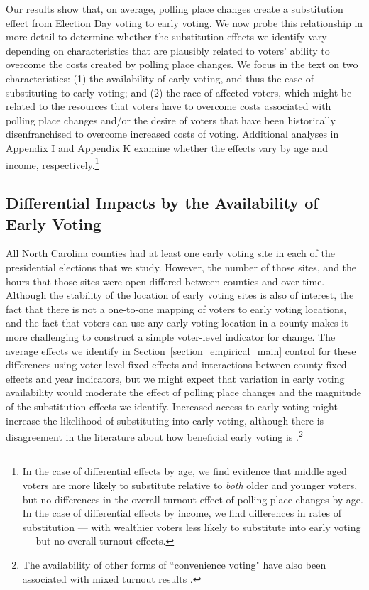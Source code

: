 \documentclass{cup_PSRM}
\begin{document}
\noindent Our results show that, on average, polling place changes create a substitution effect from Election Day voting to early voting.  We now probe this relationship in more detail to determine whether the substitution effects we identify vary depending on characteristics that are plausibly related to voters' ability to overcome the costs created by polling place changes. We focus in the text on two characteristics: (1) the availability of early voting, and thus the ease of substituting to early voting; and (2) the race of affected voters, which might be related to the resources that voters have to overcome costs associated with polling place changes and/or the desire of voters that have been historically disenfranchised to overcome increased costs of voting. Additional analyses in Appendix I and Appendix K examine whether the effects vary by age and income, respectively.\footnote{In the case of differential effects by age, we find evidence that middle aged voters are more likely to substitute relative to \emph{both} older and younger voters, but no differences in the overall turnout effect of polling place changes by age.  In the case of differential effects by income, we find differences in rates of substitution --- with wealthier voters less likely to substitute into early voting --- but no overall turnout effects.}

\subsection{Differential Impacts by the Availability of Early Voting}

All North Carolina counties had at least one early voting site in each of the presidential elections that we study.  However, the number of those sites, and the hours that those sites were open differed between counties and over time.  Although the stability of the location of early voting sites is also of interest, the fact that there is not a one-to-one mapping of voters to early voting locations, and the fact that voters can use any early voting location in a county makes it more challenging to construct a simple voter-level indicator for change.    The average effects we identify in Section~\ref{section_empirical_main}  control for these differences using voter-level fixed effects and interactions between county fixed effects and year indicators, but we might expect that variation in early voting availability would moderate the effect of polling place changes and the magnitude of the substitution effects we identify.  Increased access to early voting might increase the likelihood of substituting into early voting, although there is disagreement in the literature about how beneficial early voting is \citep{burden2017complicated,burden2014election,herron2015race,fullmer2015}.\footnote{The availability of other forms of ``convenience voting" have also been associated with mixed turnout results \citep{gronke2007early, karp2000going, kousser2007does, gerber2013identifying}.}
\end{document}
